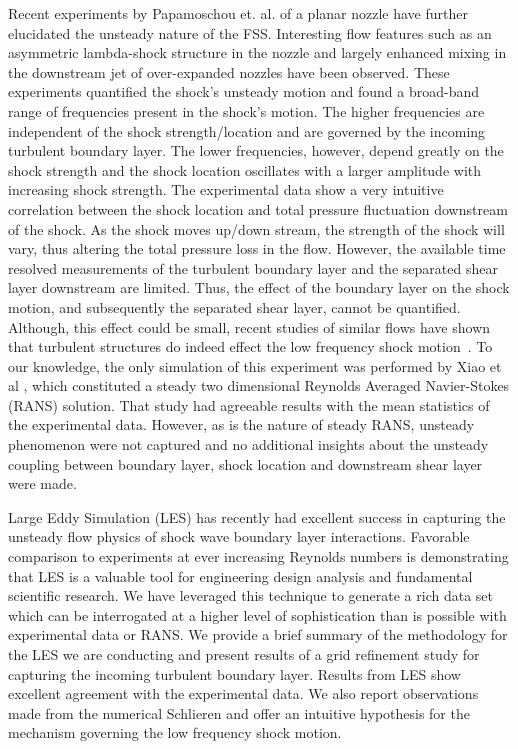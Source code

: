 \documentclass[]{aiaa-tc}%
\begin{document}
Recent experiments by Papamoschou et. al.\cite{Papam:09,Papam:10,Papam:06} of a planar nozzle have further elucidated the unsteady nature of the FSS.  Interesting flow features such as an asymmetric lambda-shock structure in the nozzle and largely enhanced mixing in the downstream jet of over-expanded nozzles have been observed.  These experiments quantified the shock's unsteady motion and found a broad-band range of frequencies present in the shock's motion.  The higher frequencies are independent of the shock strength/location and are governed by the incoming turbulent boundary layer.  The lower frequencies, however, depend greatly on the shock strength and the shock location oscillates with a larger amplitude with increasing shock strength.  The experimental data show a very intuitive correlation between the shock location and total pressure fluctuation downstream of the shock.  As the shock moves up/down stream, the strength of the shock will vary, thus altering the total pressure loss in the flow.  However, the available time resolved measurements of the turbulent boundary layer and the separated shear layer downstream are limited.  Thus, the effect of the boundary layer on the shock motion, and subsequently the separated shear layer, cannot be quantified.  Although, this effect could be small, recent studies of similar flows have shown that turbulent structures do indeed effect the low frequency shock motion~\cite{Touber:09}.  To our knowledge, the only simulation of this experiment was performed by Xiao et al \cite{Xiao:07}, which constituted a steady two dimensional Reynolds Averaged Navier-Stokes (RANS) solution.  That study had agreeable results with the mean statistics of the experimental data.  However, as is the nature of steady RANS, unsteady phenomenon were not captured and no additional insights about the unsteady coupling between boundary layer, shock location and downstream shear layer were made.

Large Eddy Simulation (LES) has recently had excellent success in capturing the unsteady flow physics of shock wave boundary layer interactions.\cite{Morgan:10b,Kawai:10aiaa,Touber:09,Pirozzoli:09}  Favorable comparison to experiments at ever increasing Reynolds numbers is demonstrating that LES is a valuable tool for engineering design analysis and fundamental scientific research.  We have leveraged this technique to generate a rich data set which can be interrogated at a higher level of sophistication than is possible with experimental data or RANS.  We provide a brief summary of the methodology for the LES we are conducting and present results of a grid refinement study for capturing the incoming turbulent boundary layer.  Results from LES show excellent agreement with the experimental data.  We also report observations made from the numerical Schlieren and offer an intuitive hypothesis for the mechanism governing the low frequency shock motion.  
\end{document}
